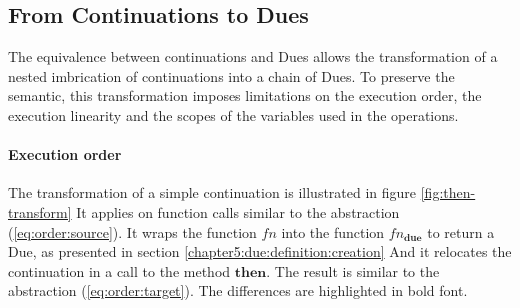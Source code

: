 \subsection{From Continuations to Dues} \label{chapter5:due:equivalence}

The equivalence between continuations and Dues allows the transformation of a nested imbrication of continuations into a chain of Dues.
To preserve the semantic, this transformation imposes limitations on the execution order, the execution linearity and the scopes of the variables used in the operations.

\paragraph{Execution order}

The transformation of a simple continuation is illustrated in figure \ref{fig:then-transform}
It applies on function calls similar to the abstraction (\ref{eq:order:source}).
It wraps the function $fn$ into the function $fn_\textbf{due}$ to return a Due, as presented in section \ref{chapter5:due:definition:creation}
And it relocates the continuation in a call to the method $\textbf{then}$.
The result is similar to the abstraction (\ref{eq:order:target}).
The differences are highlighted in bold font.


